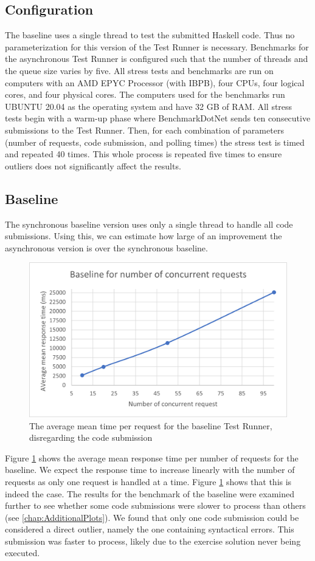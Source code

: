 \subsection{Configuration}
The baseline uses a single thread to test the submitted Haskell code.
Thus no parameterization for this version of the Test Runner is necessary.
Benchmarks for the asynchronous Test Runner is configured such that the number of threads and the queue size varies by five. 
All stress tests and benchmarks are run on computers with an AMD EPYC Processor (with IBPB), four CPUs, four logical cores, and four physical cores.
The computers used for the benchmarks run UBUNTU 20.04 as the operating system and have 32 GB of RAM.
All stress tests begin with a warm-up phase where BenchmarkDotNet sends ten consecutive submissions to the Test Runner. 
Then, for each combination of parameters (number of requests, code submission, and polling times) the stress test is timed and repeated 40 times.
This whole process is repeated five times to ensure outliers does not significantly affect the results.

\subsection{Baseline}
The synchronous baseline version uses only a single thread to handle all code submissions.
Using this, we can estimate how large of an improvement the asynchronous version is over the synchronous baseline.

\begin{figure}
  \centering
  \includegraphics[scale=0.80]{images/baseline.png}
  \caption{The average mean time per request for the baseline Test Runner, disregarding the code submission}
  \label{fig:baseline}
\end{figure}
Figure \ref{fig:baseline} shows the average mean response time per number of requests for the baseline.
We expect the response time to increase linearly with the number of requests as only one request is handled at a time.
Figure \ref{fig:baseline} shows that this is indeed the case.
The results for the benchmark of the baseline were examined further to see whether some code submissions were slower to process than others (see \ref{chap:AdditionalPlots}). 
We found that only one code submission could be considered a direct outlier, namely the one containing syntactical errors.
This submission was faster to process, likely due to the exercise solution never being executed.


